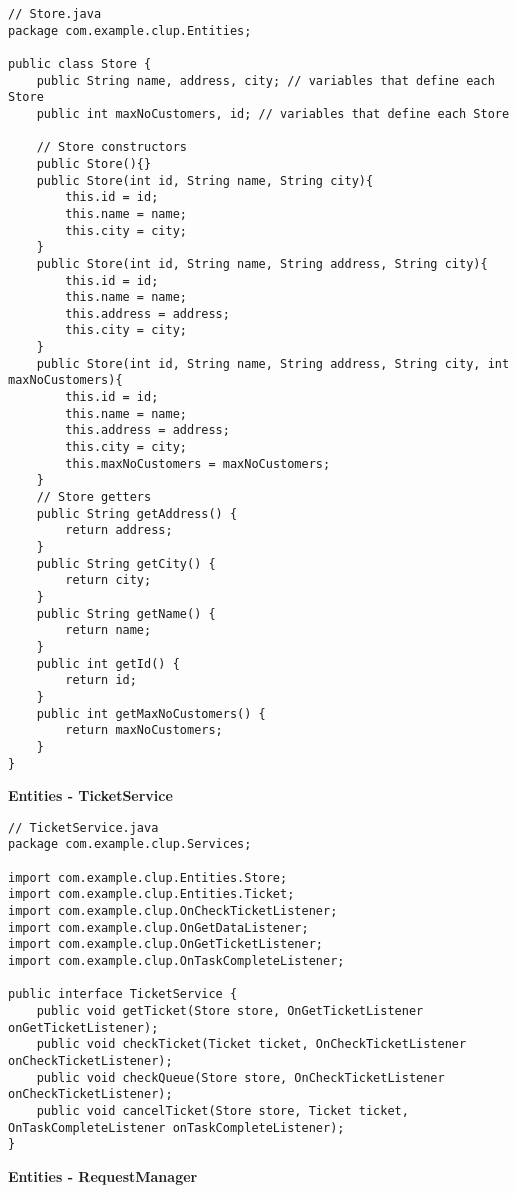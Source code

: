 \begin{lstlisting}
// Store.java
package com.example.clup.Entities;

public class Store {
    public String name, address, city; // variables that define each Store
    public int maxNoCustomers, id; // variables that define each Store

    // Store constructors
    public Store(){}
    public Store(int id, String name, String city){
        this.id = id;
        this.name = name;
        this.city = city;
    }
    public Store(int id, String name, String address, String city){
        this.id = id;
        this.name = name;
        this.address = address;
        this.city = city;
    }
    public Store(int id, String name, String address, String city, int maxNoCustomers){
        this.id = id;
        this.name = name;
        this.address = address;
        this.city = city;
        this.maxNoCustomers = maxNoCustomers;
    }
    // Store getters
    public String getAddress() {
        return address;
    }
    public String getCity() {
        return city;
    }
    public String getName() {
        return name;
    }
    public int getId() {
        return id;
    }
    public int getMaxNoCustomers() {
        return maxNoCustomers;
    }
}
\end{lstlisting}

\textbf{Entities - TicketService}

\begin{lstlisting}
// TicketService.java
package com.example.clup.Services;

import com.example.clup.Entities.Store;
import com.example.clup.Entities.Ticket;
import com.example.clup.OnCheckTicketListener;
import com.example.clup.OnGetDataListener;
import com.example.clup.OnGetTicketListener;
import com.example.clup.OnTaskCompleteListener;

public interface TicketService {
    public void getTicket(Store store, OnGetTicketListener onGetTicketListener);
    public void checkTicket(Ticket ticket, OnCheckTicketListener onCheckTicketListener);
    public void checkQueue(Store store, OnCheckTicketListener onCheckTicketListener);
    public void cancelTicket(Store store, Ticket ticket, OnTaskCompleteListener onTaskCompleteListener);
}
\end{lstlisting}

\textbf{Entities - RequestManager}

